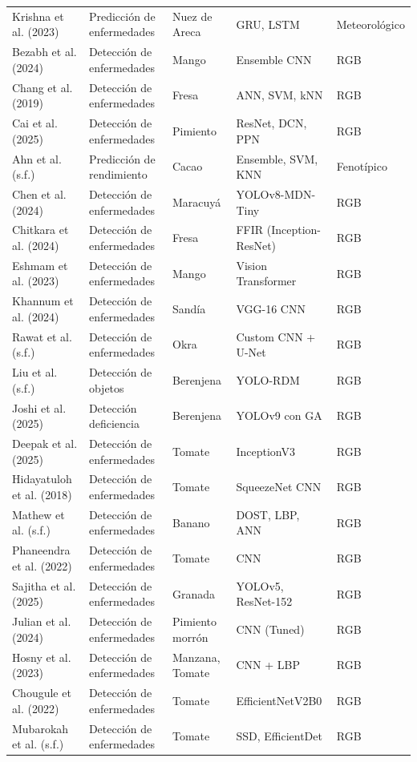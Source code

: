 \documentclass[agriculture,article,submit,pdftex,moreauthors]{Definitions/mdpi}
\begin{document}
\begin{footnotesize}
\begin{longtable}{p{3cm} p{2cm} p{2cm} p{2.8cm} p{2cm}}
Krishna et al. (2023) & Predicción de enfermedades & Nuez de Areca & GRU, LSTM & Meteorológico \\
Bezabh et al. (2024) & Detección de enfermedades & Mango & Ensemble CNN & RGB \\
Chang et al. (2019) & Detección de enfermedades & Fresa & ANN, SVM, kNN & RGB \\
Cai et al. (2025) & Detección de enfermedades & Pimiento & ResNet, DCN, PPN & RGB \\
Ahn et al. (s.f.) & Predicción de rendimiento & Cacao & Ensemble, SVM, KNN & Fenotípico \\
Chen et al. (2024) & Detección de enfermedades & Maracuyá & YOLOv8-MDN-Tiny & RGB \\
Chitkara et al. (2024) & Detección de enfermedades & Fresa & FFIR (Inception-ResNet) & RGB \\
Eshmam et al. (2023) & Detección de enfermedades & Mango & Vision Transformer & RGB \\
Khannum et al. (2024) & Detección de enfermedades & Sandía & VGG-16 CNN & RGB \\
Rawat et al. (s.f.) & Detección de enfermedades & Okra & Custom CNN + U-Net & RGB \\
Liu et al. (s.f.) & Detección de objetos & Berenjena & YOLO-RDM & RGB \\
Joshi et al. (2025) & Detección deficiencia & Berenjena & YOLOv9 con GA & RGB \\
Deepak et al. (2025) & Detección de enfermedades & Tomate & InceptionV3 & RGB \\
Hidayatuloh et al. (2018) & Detección de enfermedades & Tomate & SqueezeNet CNN & RGB \\
Mathew et al. (s.f.) & Detección de enfermedades & Banano & DOST, LBP, ANN & RGB \\
Phaneendra et al. (2022) & Detección de enfermedades & Tomate & CNN & RGB \\
Sajitha et al. (2025) & Detección de enfermedades & Granada & YOLOv5, ResNet-152 & RGB \\
Julian et al. (2024) & Detección de enfermedades & Pimiento morrón & CNN (Tuned) & RGB \\
Hosny et al. (2023) & Detección de enfermedades & Manzana, Tomate & CNN + LBP & RGB \\
Chougule et al. (2022) & Detección de enfermedades & Tomate & EfficientNetV2B0 & RGB \\
Mubarokah et al. (s.f.) & Detección de enfermedades & Tomate & SSD, EfficientDet & RGB \\

\end{longtable}
\end{footnotesize}
\end{document}
